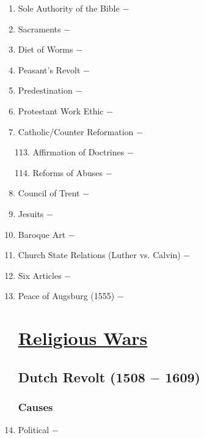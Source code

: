 \documentclass[12pt]{article}
\begin{document}
\begin{enumerate}
\item Sole Authority of the Bible $-$

\item Sacraments $-$

\item Diet of Worms $-$ 

\item Peasant's Revolt $-$

\item Predestination $-$ 

\item Protestant Work Ethic $-$ 

\item Catholic/Counter Reformation $-$ 

\begin{enumerate}[label=\arabic{*}.]
\setcounter{enumii}{112}
\item Affirmation of Doctrines $-$

\item Reforms of Abuses $-$

\end{enumerate}
\setcounter{enumi}{114}
\item Council of Trent $-$

\item Jesuits $-$  

\item Baroque Art $-$

\item Church State Relations (Luther vs. Calvin) $-$

\item Six Articles $-$

\item Peace of Augsburg (1555) $-$

\section{\underline{Religious Wars}}

\subsection{Dutch Revolt (1508 $-$ 1609)}

\subsubsection{Causes}

\item Political $-$ 


\end{enumerate}
\end{document}
